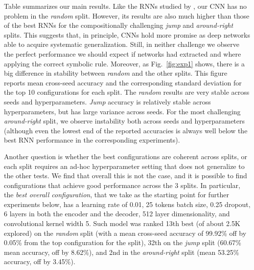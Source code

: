 Table  summarizes our main results. Like the RNNs studied by
, our CNN has no problem in the
\emph{random} split. However, its results are also much higher than
those of the best RNNs for the compositionally challenging \emph{jump}
and \emph{around-right} splits. This suggests that, in principle, CNNs
hold more promise as deep networks able to acquire systematic
generalization. Still, in neither challenge we observe the perfect
performance we should expect if networks had extracted and where
applying the correct symbolic rule. Moreover, as Fig.~\ref{fig:exp1}
shows, there is a big difference in stability between \emph{random}
and the other splits. This figure reports mean cross-seed accuracy and
the corresponding standard deviation for the top 10 configurations for
each split. The \emph{random} results are very stable across seeds and
hyperparameters. \emph{Jump} accuracy is relatively stable across
hyperparameters, but has large variance across seeds. For the most
challenging \emph{around-right} split, we observe instability both
across seeds and hyperparameters (although even the lowest end of the
reported accuracies is always well below the best RNN performance in
the corresponding experiments).

Another question is whether the best configurations are coherent
across splits, or each split requires an ad-hoc hyperparameter setting
that does not generalize to the other tests. We find that overall this
is not the case, and it is possible to find configurations that
achieve good performance across the 3 splits. In particular, the
\emph{best overall configuration}, that we take as the starting point
for further experiments below, has a learning rate of 0.01, 25 tokens
batch size, 0.25 dropout, 6 layers in both the encoder and the
decoder, 512 layer dimensionality, and convolutional kernel width
5. Such model was ranked 13th best (of about 2.5K explored) on the
\emph{random} split (with a mean cross-seed accuracy of 99.92\% off by
0.05\% from the top configuration for the split), 32th on the
\emph{jump} split (60.67\% mean accuracy, off by 8.62\%), and 2nd in
the \emph{around-right} split (mean 53.25\% accuracy, off by
3.45\%). 

